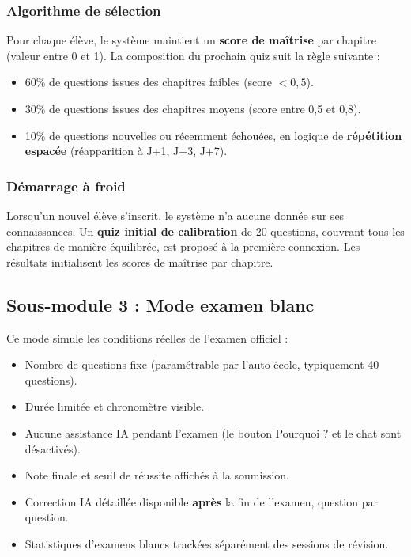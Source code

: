 \documentclass[12pt,a4paper]{article}
\begin{document}
\subsubsection{Algorithme de sélection}

Pour chaque élève, le système maintient un \textbf{score de maîtrise} par chapitre (valeur entre 0 et 1). La composition du prochain quiz suit la règle suivante :

\begin{itemize}[leftmargin=*,itemsep=4pt]
    \item 60\% de questions issues des chapitres faibles (score $< 0{,}5$).
    \item 30\% de questions issues des chapitres moyens (score entre 0{,}5 et 0{,}8).
    \item 10\% de questions nouvelles ou récemment échouées, en logique de \textbf{répétition espacée} (réapparition à J+1, J+3, J+7).
\end{itemize}

\subsubsection{Démarrage à froid}

Lorsqu'un nouvel élève s'inscrit, le système n'a aucune donnée sur ses connaissances. Un \textbf{quiz initial de calibration} de 20 questions, couvrant tous les chapitres de manière équilibrée, est proposé à la première connexion. Les résultats initialisent les scores de maîtrise par chapitre.

\subsection{Sous-module 3 : Mode examen blanc}

Ce mode simule les conditions réelles de l'examen officiel :

\begin{itemize}[leftmargin=*,itemsep=4pt]
    \item Nombre de questions fixe (paramétrable par l'auto-école, typiquement 40 questions).
    \item Durée limitée et chronomètre visible.
    \item Aucune assistance IA pendant l'examen (le bouton \og Pourquoi ? \fg{} et le chat sont désactivés).
    \item Note finale et seuil de réussite affichés à la soumission.
    \item Correction IA détaillée disponible \textbf{après} la fin de l'examen, question par question.
    \item Statistiques d'examens blancs trackées séparément des sessions de révision.
\end{itemize}
\end{document}
